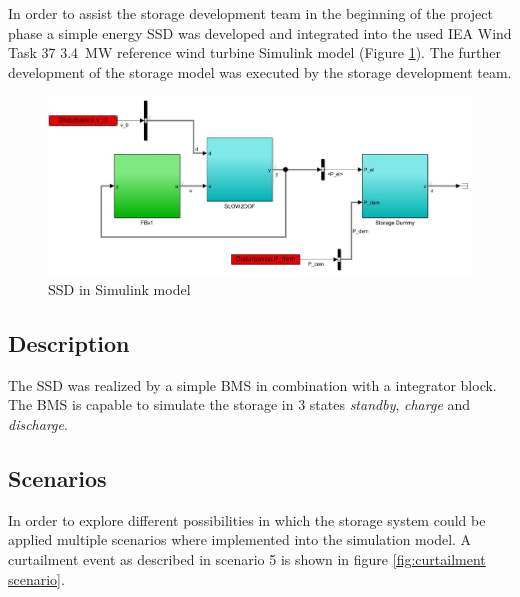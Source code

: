In order to assist the storage development team in the beginning of the project phase a simple energy \gls{SSD} was developed and integrated into the used IEA Wind Task 37 \SI{3.4}{MW} \cite{IEA} reference wind turbine Simulink model (Figure \ref{fig:Storage dummy}).
The further development of the storage model was executed by the storage development team.

\begin{figure}[tbh]
	\centering	
	\includegraphics[width=12cm]{Figures/StorageDummy}
	\caption{\gls{SSD} in Simulink model}
	\label{fig:Storage dummy}
\end{figure} 

\subsection*{Description}
The \gls{SSD} was realized by a simple \gls{BMS} in combination with a integrator block.
The \gls{BMS} is capable to simulate the storage in 3 states \textit{standby}, \textit{charge} and \textit{discharge}.

\subsection*{Scenarios}
In order to explore different possibilities in which the storage system could be applied multiple scenarios where implemented into the simulation model.
A curtailment event as described in scenario 5 is shown in figure \ref{fig:curtailment scenario}.

